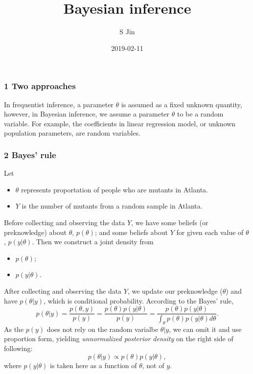 \documentclass[]{article}
\title{Bayesian inference}
\author{S Jin}
\date{2019-02-11}
\begin{document}
\maketitle

\subsubsection{1 Two approaches}\label{two-approaches}

In frequentist inference, a parameter \(\theta\) is assumed as a fixed
unknown quantity, however, in Bayesian inference, we assume a parameter
\(\theta\) to be a random variable. For example, the coefficients in
linear regression model, or unknown population parameters, are random
variables.

\subsubsection{2 Bayes' rule}\label{bayes-rule}

Let

\begin{itemize}
\item
  \(\theta\) represents proportation of people who are mutants in
  Atlanta.
\item
  \(Y\) is the number of mutants from a random sample in Atlanta.
\end{itemize}

Before collecting and observing the data \(Y\), we have some beliefs (or
preknowledge) about \(\theta\), \(p(\theta)\); and some beliefs about
\(Y\) for given each value of \(\theta\), \(p(y|\theta)\). Then we
construct a joint density from

\begin{itemize}
\item
  \(p(\theta)\);
\item
  \(p(y|\theta)\).
\end{itemize}

After collecting and observing the data \(Y\), we update our
preknowledge (\(\theta\)) and have \(p(\theta|y)\), which is conditional
probability. According to the Bayes' rule,
\[p(\theta|y) = \frac{p(\theta,y)}{p(y)}=\frac{p(\theta)p(y|\theta)}{p(y)}=\frac{p(\theta)p(y|\theta)}{\int_{\theta}p(\theta)p(y|\theta)d\theta}.\]
As the \(p(y)\) does not rely on the random varialbe \(\theta|y\), we
can omit it and use proportion form, yielding \emph{unnormalized
posterior density} on the right side of following:
\[p(\theta|y)\propto p(\theta)p(y|\theta),\] where \(p(y|\theta)\) is
taken here as a function of \(\theta\), not of \(y\).
\end{document}
